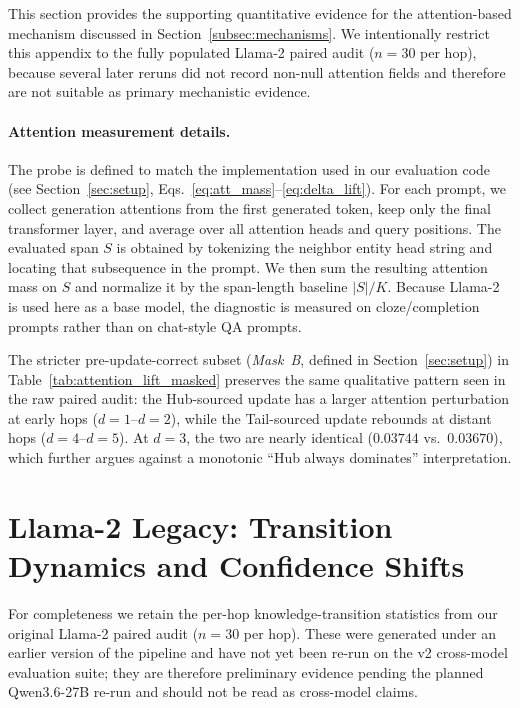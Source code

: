 This section provides the supporting quantitative evidence for the attention-based mechanism discussed in Section~\ref{subsec:mechanisms}. We intentionally restrict this appendix to the fully populated Llama-2 paired audit ($n=30$ per hop), because several later reruns did not record non-null attention fields and therefore are not suitable as primary mechanistic evidence.

\paragraph{Attention measurement details.}
The probe is defined to match the implementation used in our evaluation code (see Section~\ref{sec:setup}, Eqs.~\ref{eq:att_mass}--\ref{eq:delta_lift}). For each prompt, we collect generation attentions from the first generated token, keep only the final transformer layer, and average over all attention heads and query positions. The evaluated span $S$ is obtained by tokenizing the neighbor entity head string and locating that subsequence in the prompt. We then sum the resulting attention mass on $S$ and normalize it by the span-length baseline $|S|/K$. Because Llama-2 is used here as a base model, the diagnostic is measured on cloze/completion prompts rather than on chat-style QA prompts.



The stricter pre-update-correct subset (\emph{Mask~B}, defined in Section~\ref{sec:setup}) in Table~\ref{tab:attention_lift_masked} preserves the same qualitative pattern seen in the raw paired audit: the Hub-sourced update has a larger attention perturbation at early hops ($d{=}1$--$d{=}2$), while the Tail-sourced update rebounds at distant hops ($d{=}4$--$d{=}5$). At $d{=}3$, the two are nearly identical ($0.03744$ vs.\ $0.03670$), which further argues against a monotonic ``Hub always dominates'' interpretation.

\section{Llama-2 Legacy: Transition Dynamics and Confidence Shifts}
\label{app:llama2_transition}

For completeness we retain the per-hop knowledge-transition statistics from our original Llama-2 paired audit ($n=30$ per hop). These were generated under an earlier version of the pipeline and have not yet been re-run on the v2 cross-model evaluation suite; they are therefore preliminary evidence pending the planned Qwen3.6-27B re-run and should not be read as cross-model claims.

